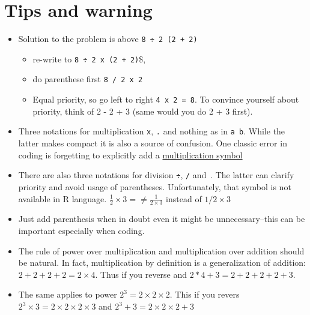 \documentclass[
  letterpaper,
  DIV=11,
  numbers=noendperiod]{scrreprt}
\providecommand{\tightlist}{%
  \setlength{\itemsep}{0pt}\setlength{\parskip}{0pt}}
\begin{document}
\section*{Tips and warning}\label{tips-and-warning}


\begin{itemize}
\tightlist
\item
  Solution to the problem is above \texttt{8\ ÷\ 2\ (2\ +\ 2)}

  \begin{itemize}
  \tightlist
  \item
    re-write to \texttt{8\ ÷\ 2\ x\ (2\ +\ 2)}\$,
  \item
    do parenthese first \texttt{8\ /\ 2\ x\ 2}
  \item
    Equal priority, so go left to right \texttt{4\ x\ 2\ =\ 8}. To
    convince yourself about priority, think of 2 - 2 + 3 (same would you
    do 2 + 3 first).
  \end{itemize}
\item
  Three notations for multiplication \texttt{x}, \texttt{.} and nothing
  \texttt{} as in \texttt{a\ b}. While the latter makes compact it is
  also a source of confusion. One classic error in coding is forgetting
  to explicitly add a \href{@sec-matrixOperationCoding}{multiplication
  symbol}
\item
  There are also three notations for division \texttt{÷}, \texttt{/} and
  \(\frac{}{}\). The latter can clarify priority and avoid usage of
  parentheses. Unfortunately, that symbol is not available in R
  language. \(\frac{1}{2} \times 3 = \neq \frac{1}{2 \times 3}\) instead
  of \(1/2 \times 3\)
\item
  Just add parenthesis when in doubt even it might be unnecessary--this
  can be important especially when coding.
\item
  The rule of power over multiplication and multiplication over addition
  should be natural. In fact, multiplication by definition is a
  generalization of addition: \(2 + 2 + 2 + 2 = 2 \times 4\). Thus if
  you reverse and \(2 * 4 + 3 = 2 + 2 + 2 + 2 + 3\).
\item
  The same applies to power \(2 ^ 3 = 2 \times 2 \times 2\). This if you
  revers \(2^3 \times 3 = 2 \times 2 \times 2 \times 3\) and
  \(2^3 + 3 = 2 \times 2 \times 2 + 3\)
\end{itemize}

~
\end{document}
